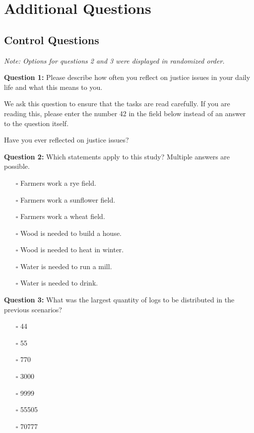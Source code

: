 \documentclass[smallcondensed]{svjour3}
\begin{document}
\section{Additional Questions}\label{sec:app_questions}
%
\subsection*{Control Questions}\label{sec:app_comprehension}
%
\noindent\textit{Note: Options for questions 2 and 3 were displayed in randomized order.}\par
%
\vspace{1ex}
\noindent\textbf{Question 1:} Please describe how often you reflect on justice issues in your daily life and what this means to you.\par
%
We ask this question to ensure that the tasks are read carefully. If you are reading this, please enter the number 42 in the field below instead of an answer to the question itself.\par
%
Have you ever reflected on justice issues?\par
%
\vspace{1ex}
\noindent\textbf{Question 2:} Which statements apply to this study? Multiple answers are possible.
\begin{itemize}
   \item[$\square$] Farmers work a rye field.
   \item[$\square$] Farmers work a sunflower field.
   \item[$\square$] Farmers work a wheat field.
   \item[$\square$] Wood is needed to build a house.
   \item[$\square$] Wood is needed to heat in winter.
   \item[$\square$] Water is needed to run a mill.
   \item[$\square$] Water is needed to drink.
\end{itemize}
\par
%
\vspace{1ex}
\noindent\textbf{Question 3:} What was the largest quantity of logs to be distributed in the previous scenarios?
%
\begin{itemize}
   \item[$\square$] 44
   \item[$\square$] 55
   \item[$\square$] 770
   \item[$\square$] 3000
   \item[$\square$] 9999
   \item[$\square$] 55505
   \item[$\square$] 70777
\end{itemize}
%
\end{document}
